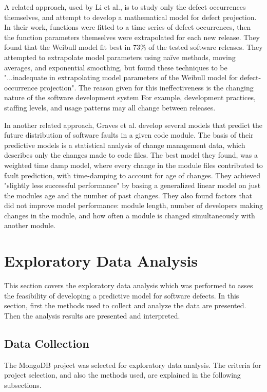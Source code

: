 \documentclass[a4paper]{scrartcl}
\begin{document}
A related approach, used by Li et al.\cite{2004_li_emperical_eval}, is to study only the defect occurrences themselves, and attempt to develop a mathematical model for defect projection. In their work, functions were fitted to a time series of defect occurrences, then the function parameters themselves were extrapolated for each new release. They found that the Weibull model fit best in 73\% of the tested software releases. They attempted to extrapolate model parameters using naïve methods, moving averages, and exponential smoothing, but found these techniques to be "...inadequate in extrapolating model parameters of the Weibull model for defect-occurrence projection". The reason given for this ineffectiveness is the changing nature of the software development system For example, development practices, staffing levels, and usage patterns may all change between releases.

In another related approach, Graves et al.\cite{2000_graves_predicting} develop several models that predict the future distribution of software faults in a given code module. The basis of their predictive models is a statistical analysis of change management data, which describes only the changes made to code files. The best model they found, was a weighted time damp model, where every change in the module files contributed to fault prediction, with time-damping to account for age of changes. They achieved "slightly less successful performance" by basing a generalized linear model on just the modules age and the number of past changes. They also found factors that did not improve model performance: module length, number of developers making changes in the module, and how often a module is changed simultaneously with another module.

\section{Exploratory Data Analysis}
\label{sec:exploratory}
This section covers the exploratory data analysis which was performed to asses the feasibility of developing a predictive model for software defects. In this section, first the methods used to collect and analyze the data are presented. Then the analysis results are presented and interpreted.

\subsection{Data Collection}
The MongoDB project was selected for exploratory data analysis. The criteria for project selection, and also the methods used, are explained in the following subsections.
\end{document}
